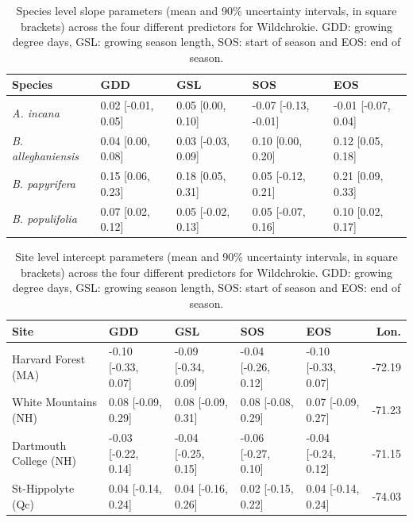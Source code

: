 \begin{table}[ht]
\centering
\caption{Species level slope parameters (mean and 90\% uncertainty intervals, in square brackets) across the four different predictors for Wildchrokie. GDD: growing degree days, GSL: growing season length, SOS: start of season and EOS: end of season.} 
\label{tab:wc_slope_table}
\begin{tabular}{lllll}
  \hline
Species & GDD & GSL & SOS & EOS \\ 
  \hline
\textit{A. incana} & 0.02 [-0.01, 0.05] & 0.05 [0.00, 0.10] & -0.07 [-0.13, -0.01] & -0.01 [-0.07, 0.04] \\ 
  \textit{B. alleghaniensis} & 0.04 [0.00, 0.08] & 0.03 [-0.03, 0.09] & 0.10 [0.00, 0.20] & 0.12 [0.05, 0.18] \\ 
  \textit{B. papyrifera} & 0.15 [0.06, 0.23] & 0.18 [0.05, 0.31] & 0.05 [-0.12, 0.21] & 0.21 [0.09, 0.33] \\ 
  \textit{B. populifolia} & 0.07 [0.02, 0.12] & 0.05 [-0.02, 0.13] & 0.05 [-0.07, 0.16] & 0.10 [0.02, 0.17] \\ 
   \hline
\end{tabular}
\end{table}


\begin{table}[ht]
\centering
\caption{Site level intercept parameters (mean and 90\% uncertainty intervals, in square brackets) across the four different predictors for Wildchrokie. GDD: growing degree days, GSL: growing season length, SOS: start of season and EOS: end of season.} 
\label{tab:wc_asite_table}
\begin{tabular}{lllllr}
  \hline
Site & GDD & GSL & SOS & EOS & Lon. \\ 
  \hline
Harvard Forest (MA) & -0.10 [-0.33, 0.07] & -0.09 [-0.34, 0.09] & -0.04 [-0.26, 0.12] & -0.10 [-0.33, 0.07] & -72.19 \\ 
  White Mountains (NH) & 0.08 [-0.09, 0.29] & 0.08 [-0.09, 0.31] & 0.08 [-0.08, 0.29] & 0.07 [-0.09, 0.27] & -71.23 \\ 
  Dartmouth College (NH) & -0.03 [-0.22, 0.14] & -0.04 [-0.25, 0.15] & -0.06 [-0.27, 0.10] & -0.04 [-0.24, 0.12] & -71.15 \\ 
  St-Hippolyte (Qc) & 0.04 [-0.14, 0.24] & 0.04 [-0.16, 0.26] & 0.02 [-0.15, 0.22] & 0.04 [-0.14, 0.24] & -74.03 \\ 
   \hline
\end{tabular}
\end{table}


